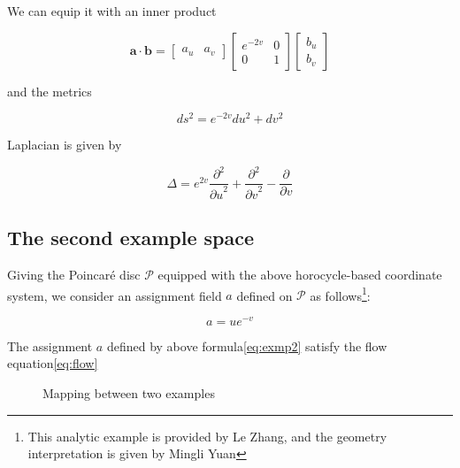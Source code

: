 We can equip it with an inner product

\[
\mathbf{a} \cdot \mathbf{b} = \begin{bmatrix} a_u & a_v \end{bmatrix} \begin{bmatrix} e^{-2v} & 0 \\ 0 & 1 \end{bmatrix} \begin{bmatrix} b_u \\ b_v \end{bmatrix}
\]

and the metrics

$$
ds^2 = e^{-2v} du^2 + dv^2
$$

Laplacian is given by\cite{Costa2001ADO}

$$
\Delta = e^{2v} \frac{\partial^2}{{\partial u}^2} + \frac{\partial^2}{{\partial v}^2} - \frac{\partial}{\partial v}
$$

\subsection{The second example space}\label{subsec:exmp2}

Giving the Poincaré disc $\mathcal{P}$ equipped with the above horocycle-based coordinate system,
we consider an assignment field $a$ defined on $\mathcal{P}$ as follows\footnote{This analytic example is provided by Le Zhang, and the geometry interpretation is given by Mingli Yuan}:

\begin{equation}\label{eq:exmp2}
a = u e^{-v}
\end{equation}

\begin{theorem}
The assignment $a$ defined by above formula\eqref{eq:exmp2} satisfy the flow equation\eqref{eq:flow}
\end{theorem}

\begin{figure}[ht]
\centering
{}
\caption{Mapping between two examples}\label{fig:mapping}
\end{figure}

